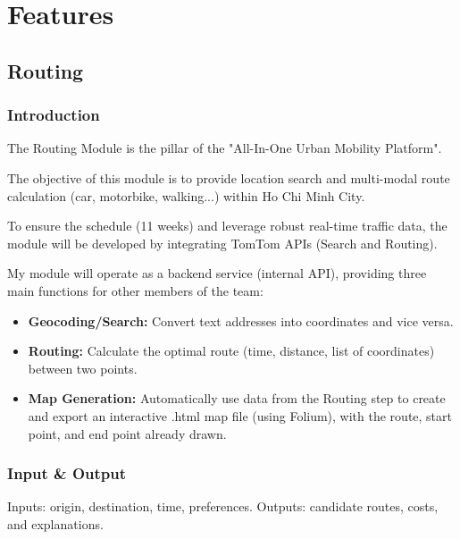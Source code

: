 \chapter{Features}
\label{chap:features}

\section{Routing}
\subsection{Introduction}
The Routing Module is the pillar of the "All-In-One Urban Mobility Platform". 

The objective of this module is to provide location search and multi-modal route calculation (car, motorbike, walking...) within Ho Chi Minh City. 

To ensure the schedule (11 weeks) and leverage robust real-time traffic data, the module will be developed by integrating TomTom APIs (Search and Routing). 

My module will operate as a backend service (internal API), providing three main functions for other members of the team:
\begin{itemize}
  \item \textbf{Geocoding/Search:} Convert text addresses into coordinates and vice versa.
  \item \textbf{Routing:} Calculate the optimal route (time, distance, list of coordinates) between two points.
  \item \textbf{Map Generation:} Automatically use data from the Routing step to create and export an interactive .html map file (using Folium), with the route, start point, and end point already drawn.
\end{itemize}

\subsection{Input \& Output}
Inputs: origin, destination, time, preferences. Outputs: candidate routes, costs, and explanations.


